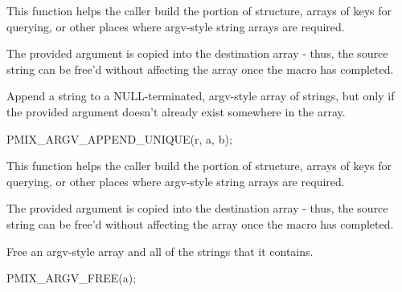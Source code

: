 \begin{arglist}
\end{arglist}

This function helps the caller build the  portion of  structure, arrays of keys for querying, or other places where argv-style string arrays are required.

\adviceuserstart
The provided argument is copied into the destination array - thus, the source string can be free'd without affecting the array once the macro has completed.
\adviceuserend


Append a string to a NULL-terminated, argv-style array of strings, but only if the provided argument doesn't already exist somewhere in the array.

\cspecificstart
\begin{codepar}
PMIX_ARGV_APPEND_UNIQUE(r, a, b);
\end{codepar}
\cspecificend

\begin{arglist}
\end{arglist}

This function helps the caller build the  portion of  structure, arrays of keys for querying, or other places where argv-style string arrays are required.

\adviceuserstart
The provided argument is copied into the destination array - thus, the source string can be free'd without affecting the array once the macro has completed.
\adviceuserend


Free an argv-style array and all of the strings that it contains.

\cspecificstart
\begin{codepar}
PMIX_ARGV_FREE(a);
\end{codepar}
\cspecificend

